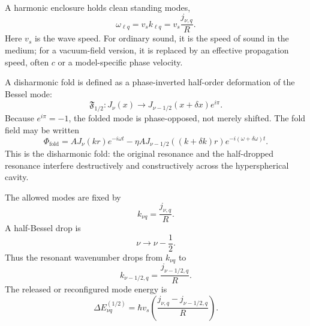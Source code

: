 \documentclass[11pt,a4paper]{article}
\renewcommand{\boxed}[1]{#1}
\begin{document}
A harmonic enclosure holds clean standing modes,
\begin{equation}
 \omega_{\ell q}=v_s k_{\ell q}=v_s\frac{j_{\nu,q}}{R}.
\label{eq:harmonic-mode}
\end{equation}
Here $v_s$ is the wave speed. For ordinary sound, it is the speed of sound in the medium; for a vacuum-field version, it is replaced by an effective propagation speed, often $c$ or a model-specific phase velocity.

A disharmonic fold is defined as a phase-inverted half-order deformation of the Bessel mode:
\begin{equation}
\boxed{\mathfrak{F}_{1/2}:J_\nu(x)\longrightarrow J_{\nu-1/2}(x+\delta x)e^{i\pi}.}
\label{eq:fold-map}
\end{equation}
Because $e^{i\pi}=-1$, the folded mode is phase-opposed, not merely shifted. The fold field may be written
\begin{equation}
\boxed{
\Phi_{\mathrm{fold}}
=
A J_\nu(kr)e^{-i\omega t}
-
\eta A J_{\nu-1/2}((k+\delta k)r)e^{-i(\omega+\delta\omega)t}.
}
\label{eq:fold-field}
\end{equation}
This is the disharmonic fold: the original resonance and the half-dropped resonance interfere destructively and constructively across the hyperspherical cavity.

The allowed modes are fixed by
\begin{equation}
 k_{\nu q}=\frac{j_{\nu,q}}{R}.
\label{eq:k-nu-q}
\end{equation}
A half-Bessel drop is
\begin{equation}
\boxed{\nu\rightarrow\nu-\frac12.}
\label{eq:half-drop}
\end{equation}
Thus the resonant wavenumber drops from $k_{\nu q}$ to
\begin{equation}
 k_{\nu-1/2,q}=\frac{j_{\nu-1/2,q}}{R}.
\label{eq:k-half}
\end{equation}
The released or reconfigured mode energy is
\begin{equation}
\boxed{
\Delta E^{(1/2)}_{\nu q}=\hbar v_s\left(\frac{j_{\nu,q}-j_{\nu-1/2,q}}{R}\right).
}
\label{eq:delta-e-half}
\end{equation}
\end{document}
